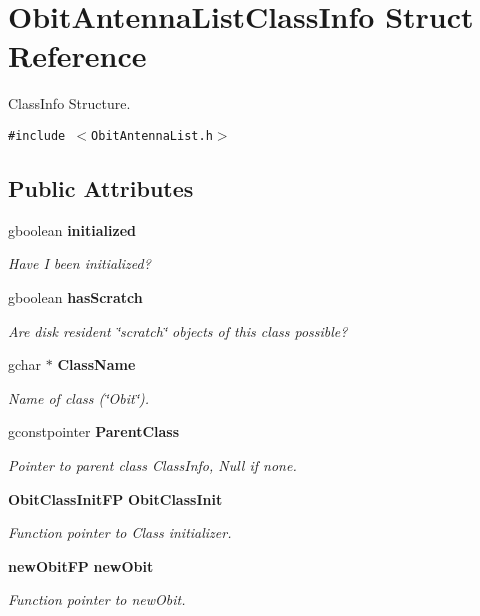 \section{Obit\-Antenna\-List\-Class\-Info Struct Reference}
\label{structObitAntennaListClassInfo}
Class\-Info Structure.  


{\tt \#include $<$Obit\-Antenna\-List.h$>$}

\subsection*{Public Attributes}
\begin{CompactItemize}
\item 
gboolean {\bf initialized}
\begin{CompactList}\small\item\em Have I been initialized? \item\end{CompactList}\item 
gboolean {\bf has\-Scratch}
\begin{CompactList}\small\item\em Are disk resident \char`\"{}scratch\char`\"{} objects of this class possible? \item\end{CompactList}\item 
gchar $\ast$ {\bf Class\-Name}
\begin{CompactList}\small\item\em Name of class (\char`\"{}Obit\char`\"{}). \item\end{CompactList}\item 
gconstpointer {\bf Parent\-Class}
\begin{CompactList}\small\item\em Pointer to parent class Class\-Info, Null if none. \item\end{CompactList}\item 
{\bf Obit\-Class\-Init\-FP} {\bf Obit\-Class\-Init}
\begin{CompactList}\small\item\em Function pointer to Class initializer. \item\end{CompactList}\item 
{\bf new\-Obit\-FP} {\bf new\-Obit}
\begin{CompactList}\small\item\em Function pointer to new\-Obit. \item\end{CompactList}\item 

\end{CompactItemize}
